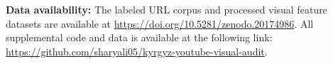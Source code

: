 \documentclass[12pt, letterpaper]{article}
\begin{document}
\noindent \textbf{Data availability:} The labeled URL corpus and processed visual feature datasets are available at \url{https://doi.org/10.5281/zenodo.20174986}. All supplemental code and data is available at the following link: \url{https://github.com/sharyali05/kyrgyz-youtube-visual-audit}.


\newpage

\end{document}
